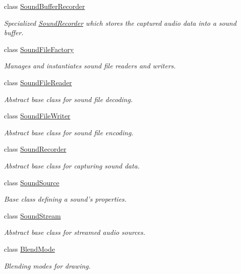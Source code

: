 \begin{DoxyCompactItemize}
class \hyperlink{classsf_1_1_sound_buffer_recorder}{Sound\-Buffer\-Recorder}
\begin{DoxyCompactList}\small\item\em Specialized \hyperlink{classsf_1_1_sound_recorder}{Sound\-Recorder} which stores the captured audio data into a sound buffer. \end{DoxyCompactList}\item 
class \hyperlink{classsf_1_1_sound_file_factory}{Sound\-File\-Factory}
\begin{DoxyCompactList}\small\item\em Manages and instantiates sound file readers and writers. \end{DoxyCompactList}\item 
class \hyperlink{classsf_1_1_sound_file_reader}{Sound\-File\-Reader}
\begin{DoxyCompactList}\small\item\em Abstract base class for sound file decoding. \end{DoxyCompactList}\item 
class \hyperlink{classsf_1_1_sound_file_writer}{Sound\-File\-Writer}
\begin{DoxyCompactList}\small\item\em Abstract base class for sound file encoding. \end{DoxyCompactList}\item 
class \hyperlink{classsf_1_1_sound_recorder}{Sound\-Recorder}
\begin{DoxyCompactList}\small\item\em Abstract base class for capturing sound data. \end{DoxyCompactList}\item 
class \hyperlink{classsf_1_1_sound_source}{Sound\-Source}
\begin{DoxyCompactList}\small\item\em Base class defining a sound's properties. \end{DoxyCompactList}\item 
class \hyperlink{classsf_1_1_sound_stream}{Sound\-Stream}
\begin{DoxyCompactList}\small\item\em Abstract base class for streamed audio sources. \end{DoxyCompactList}\item 
class \hyperlink{structsf_1_1_blend_mode}{Blend\-Mode}
\begin{DoxyCompactList}\small\item\em Blending modes for drawing. \end{DoxyCompactList}\item 

\end{DoxyCompactItemize}
